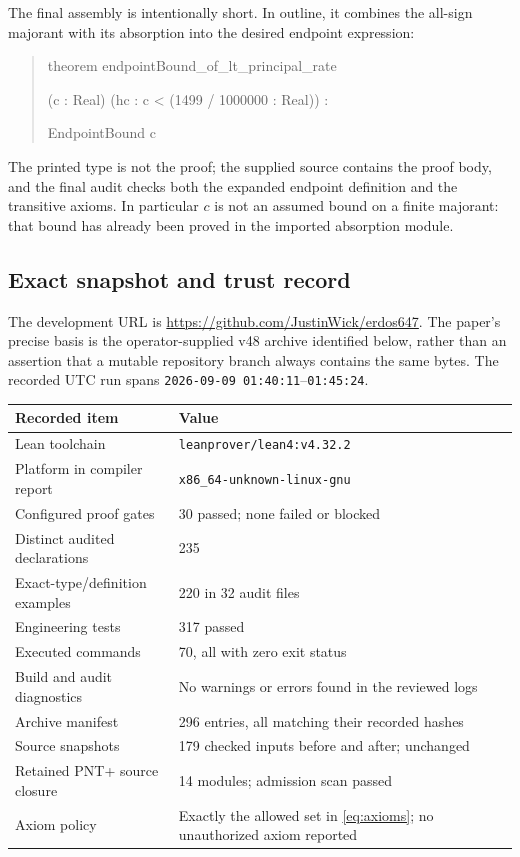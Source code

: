 \documentclass[11pt,a4paper]{article}
\theoremstyle{definition}
\theoremstyle{remark}
\numberwithin{equation}{section}
\newcommand{\smallcode}[1]{{\small\texttt{#1}}}
\begin{document}
\endgroup

The final assembly is intentionally short. In outline, it combines the
all-sign majorant with its absorption into the desired endpoint expression:
\begin{quote}\small\ttfamily
 theorem endpointBound\_of\_lt\_principal\_rate\par
\hspace*{1em}(c : Real) (hc : c < (1499 / 1000000 : Real)) :\par
\hspace*{1em}EndpointBound c
\end{quote}
The printed type is not the proof; the supplied source contains the proof
body, and the final audit checks both the expanded endpoint definition and the
transitive axioms. In particular $c$ is not an assumed bound on a finite
majorant: that bound has already been proved in the imported absorption module.

\subsection{Exact snapshot and trust record}
The development URL is \url{https://github.com/JustinWick/erdos647}.
The paper's precise basis is the operator-supplied v48 archive identified below,
rather than an assertion that a mutable repository branch always contains the
same bytes. The recorded UTC run spans
\texttt{2026-09-09 01:40:11}--\texttt{01:45:24}.

\begin{center}
\begin{tabularx}{\textwidth}{@{}p{}X@{}}
\toprule
Recorded item & Value \\
\midrule
Lean toolchain & \smallcode{leanprover/lean4:v4.32.2} \\
Platform in compiler report & \smallcode{x86\_64-unknown-linux-gnu} \\
Configured proof gates & 30 passed; none failed or blocked \\
Distinct audited declarations & 235 \\
Exact-type/definition examples & 220 in 32 audit files \\
Engineering tests & 317 passed \\
Executed commands & 70, all with zero exit status \\
Build and audit diagnostics & No warnings or errors found in the reviewed logs \\
Archive manifest & 296 entries, all matching their recorded hashes \\
Source snapshots & 179 checked inputs before and after; unchanged \\
Retained PNT+ source closure & 14 modules; admission scan passed \\
Axiom policy & Exactly the allowed set in \eqref{eq:axioms}; no unauthorized axiom reported \\
\bottomrule
\end{tabularx}
\end{center}
\end{document}
